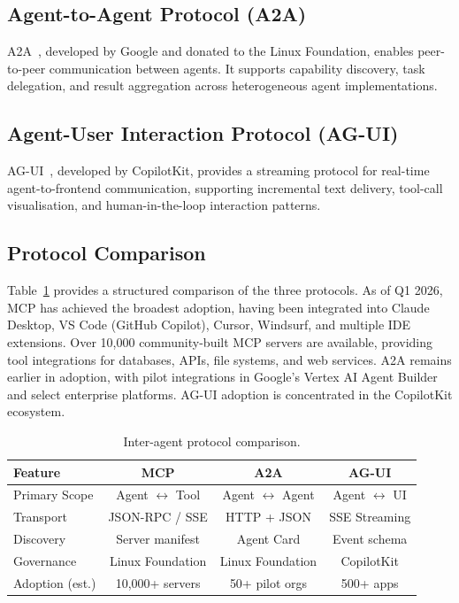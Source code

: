 \documentclass[12pt, a4paper]{article}
\begin{document}
\subsection{Agent-to-Agent Protocol (A2A)}
A2A~\citep{google2024a2a}, developed by Google and donated to the Linux Foundation, enables peer-to-peer communication between agents. It supports capability discovery, task delegation, and result aggregation across heterogeneous agent implementations.

\subsection{Agent-User Interaction Protocol (AG-UI)}
AG-UI~\citep{copilotkit2024agui}, developed by CopilotKit, provides a streaming protocol for real-time agent-to-frontend communication, supporting incremental text delivery, tool-call visualisation, and human-in-the-loop interaction patterns.

\subsection{Protocol Comparison}
Table~\ref{tab:protocols} provides a structured comparison of the three protocols. As of Q1 2026, MCP has achieved the broadest adoption, having been integrated into Claude Desktop, VS Code (GitHub Copilot), Cursor, Windsurf, and multiple IDE extensions. Over 10,000 community-built MCP servers are available, providing tool integrations for databases, APIs, file systems, and web services. A2A remains earlier in adoption, with pilot integrations in Google's Vertex AI Agent Builder and select enterprise platforms. AG-UI adoption is concentrated in the CopilotKit ecosystem.

\begin{table}[ht]
\centering
\caption{Inter-agent protocol comparison.}
\label{tab:protocols}
\begin{tabular}{lccc}
\toprule
\textbf{Feature} & \textbf{MCP} & \textbf{A2A} & \textbf{AG-UI} \\
\midrule
Primary Scope        & Agent $\leftrightarrow$ Tool & Agent $\leftrightarrow$ Agent & Agent $\leftrightarrow$ UI \\
Transport            & JSON-RPC / SSE               & HTTP + JSON                   & SSE Streaming \\
Discovery            & Server manifest              & Agent Card                    & Event schema \\
Governance           & Linux Foundation             & Linux Foundation              & CopilotKit \\
Adoption (est.)      & 10,000+ servers              & 50+ pilot orgs                & 500+ apps \\
\bottomrule
\end{tabular}
\end{table}
\end{document}
